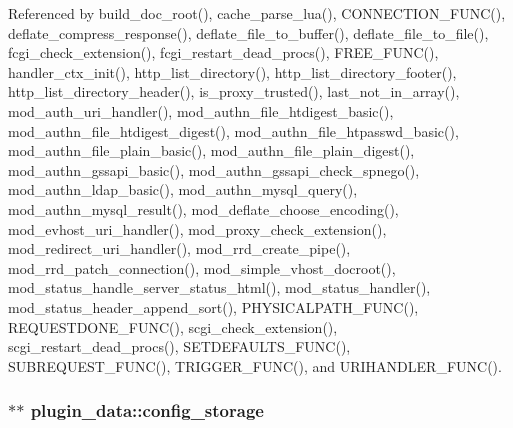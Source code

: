 Referenced by build\-\_\-doc\-\_\-root(), cache\-\_\-parse\-\_\-lua(), C\-O\-N\-N\-E\-C\-T\-I\-O\-N\-\_\-\-F\-U\-N\-C(), deflate\-\_\-compress\-\_\-response(), deflate\-\_\-file\-\_\-to\-\_\-buffer(), deflate\-\_\-file\-\_\-to\-\_\-file(), fcgi\-\_\-check\-\_\-extension(), fcgi\-\_\-restart\-\_\-dead\-\_\-procs(), F\-R\-E\-E\-\_\-\-F\-U\-N\-C(), handler\-\_\-ctx\-\_\-init(), http\-\_\-list\-\_\-directory(), http\-\_\-list\-\_\-directory\-\_\-footer(), http\-\_\-list\-\_\-directory\-\_\-header(), is\-\_\-proxy\-\_\-trusted(), last\-\_\-not\-\_\-in\-\_\-array(), mod\-\_\-auth\-\_\-uri\-\_\-handler(), mod\-\_\-authn\-\_\-file\-\_\-htdigest\-\_\-basic(), mod\-\_\-authn\-\_\-file\-\_\-htdigest\-\_\-digest(), mod\-\_\-authn\-\_\-file\-\_\-htpasswd\-\_\-basic(), mod\-\_\-authn\-\_\-file\-\_\-plain\-\_\-basic(), mod\-\_\-authn\-\_\-file\-\_\-plain\-\_\-digest(), mod\-\_\-authn\-\_\-gssapi\-\_\-basic(), mod\-\_\-authn\-\_\-gssapi\-\_\-check\-\_\-spnego(), mod\-\_\-authn\-\_\-ldap\-\_\-basic(), mod\-\_\-authn\-\_\-mysql\-\_\-query(), mod\-\_\-authn\-\_\-mysql\-\_\-result(), mod\-\_\-deflate\-\_\-choose\-\_\-encoding(), mod\-\_\-evhost\-\_\-uri\-\_\-handler(), mod\-\_\-proxy\-\_\-check\-\_\-extension(), mod\-\_\-redirect\-\_\-uri\-\_\-handler(), mod\-\_\-rrd\-\_\-create\-\_\-pipe(), mod\-\_\-rrd\-\_\-patch\-\_\-connection(), mod\-\_\-simple\-\_\-vhost\-\_\-docroot(), mod\-\_\-status\-\_\-handle\-\_\-server\-\_\-status\-\_\-html(), mod\-\_\-status\-\_\-handler(), mod\-\_\-status\-\_\-header\-\_\-append\-\_\-sort(), P\-H\-Y\-S\-I\-C\-A\-L\-P\-A\-T\-H\-\_\-\-F\-U\-N\-C(), R\-E\-Q\-U\-E\-S\-T\-D\-O\-N\-E\-\_\-\-F\-U\-N\-C(), scgi\-\_\-check\-\_\-extension(), scgi\-\_\-restart\-\_\-dead\-\_\-procs(), S\-E\-T\-D\-E\-F\-A\-U\-L\-T\-S\-\_\-\-F\-U\-N\-C(), S\-U\-B\-R\-E\-Q\-U\-E\-S\-T\-\_\-\-F\-U\-N\-C(), T\-R\-I\-G\-G\-E\-R\-\_\-\-F\-U\-N\-C(), and U\-R\-I\-H\-A\-N\-D\-L\-E\-R\-\_\-\-F\-U\-N\-C().

\hypertarget{structplugin__data_af26449c8e3dccfa1d98834dd1e0dad9a}{
\subsubsection[{config\-\_\-storage}]{ $\ast$$\ast$ plugin\-\_\-data\-::config\-\_\-storage}}\label{structplugin__data_af26449c8e3dccfa1d98834dd1e0dad9a}



